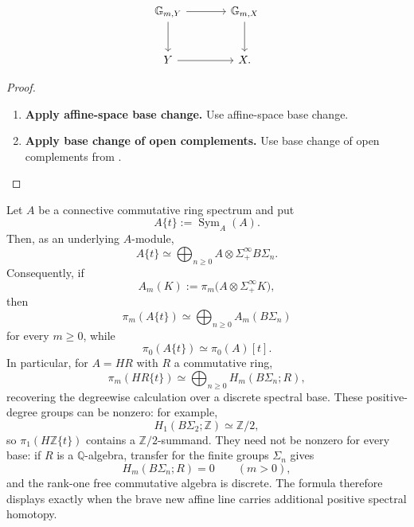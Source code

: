 \[
\begin{tikzcd}[column sep=large, row sep=large]
    \mathbb G_{m,Y}
        \arrow[r]
        \arrow[d]
    &
    \mathbb G_{m,X}
        \arrow[d]
    \\
    Y
        \arrow[r]
    &
    X.
\end{tikzcd}
\]


\begin{proof}
\leavevmode
\begin{enumerate}[label=\textup{(\arabic*)}]
    \item \textbf{Apply affine-space base change.}
    Use affine-space base change.

    \item \textbf{Apply base change of open complements.}
    Use base change of open complements from
    .
\end{enumerate}
\end{proof}

\begin{proposition}
\label{prop:affine-line-genuinely-spectral}
Let \(A\) be a connective commutative ring spectrum and put
\[
    A\{t\}
    :=
    \operatorname{Sym}_A(A).
\]
Then, as an underlying \(A\)-module,
\[
    A\{t\}
    \simeq
    \bigoplus_{n\geq0}
    A\otimes\Sigma^\infty_+B\Sigma_n.
\]
Consequently, if
\[
    A_m(K)
    :=
    \pi_m\bigl(A\otimes\Sigma^\infty_+K\bigr),
\]
then
\[
    \pi_m(A\{t\})
    \simeq
    \bigoplus_{n\geq0}A_m(B\Sigma_n)
\]
for every \(m\geq0\), while
\[
    \pi_0(A\{t\})
    \simeq
    \pi_0(A)[t].
\]
In particular, for \(A=HR\) with \(R\) a commutative ring,
\[
    \pi_m(HR\{t\})
    \simeq
    \bigoplus_{n\geq0}H_m(B\Sigma_n;R),
\]
recovering the degreewise calculation over a discrete spectral base. These
positive-degree groups can be nonzero: for example,
\[
    H_1(B\Sigma_2;\mathbb Z)
    \simeq
    \mathbb Z/2,
\]
so \(\pi_1(H\mathbb Z\{t\})\) contains a \(\mathbb Z/2\)-summand. They need
not be nonzero for every base: if \(R\) is a \(\mathbb Q\)-algebra, transfer
for the finite groups \(\Sigma_n\) gives
\[
    H_m(B\Sigma_n;R)=0
    \qquad(m>0),
\]
and the rank-one free commutative algebra is discrete. The formula therefore
displays exactly when the brave new affine line carries additional positive
spectral homotopy.
\end{proposition}

